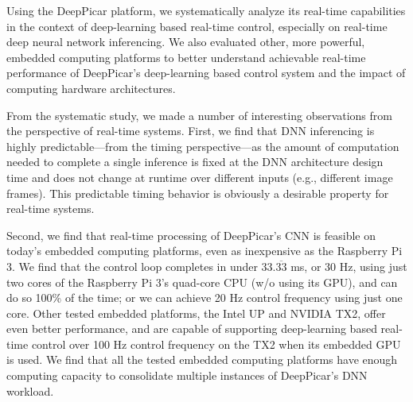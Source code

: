 Using the DeepPicar platform, we systematically analyze its real-time
capabilities in the context of deep-learning based real-time
control, especially on real-time deep neural network inferencing.
We also evaluated other, more powerful, embedded computing
platforms to better understand achievable real-time performance of
DeepPicar's deep-learning based control system and the impact of
computing hardware architectures.

%
%
%
%
%
%
From the systematic study, we made a number of interesting
observations from the perspective of real-time systems.
First, we find that DNN inferencing is highly predictable---from the
timing perspective---as the amount of computation needed to complete a
single inference is fixed at the DNN architecture design time and does
not change at runtime over different inputs (e.g., different image
frames). This predictable timing behavior is obviously a desirable
property for real-time systems.

Second, we find that real-time processing of DeepPicar's CNN is
feasible on today's embedded computing platforms, even  
as inexpensive as the Raspberry Pi 3. We find that the control loop 
completes in under 33.$\overline{\mbox{33}}$ ms, or 30 Hz, using just two 
cores of the Raspberry Pi 3's quad-core CPU (w/o using its GPU), and can
do so 100\% of the time; or we can achieve 20 Hz control frequency using
just one core.
Other tested embedded platforms, the Intel UP and NVIDIA TX2, offer even
better performance, and are capable of supporting deep-learning based 
real-time control over 100 Hz control frequency on the TX2 when its
embedded GPU is used.
We find that all the tested embedded computing platforms have 
enough computing capacity to consolidate multiple instances of
DeepPicar's DNN workload.

